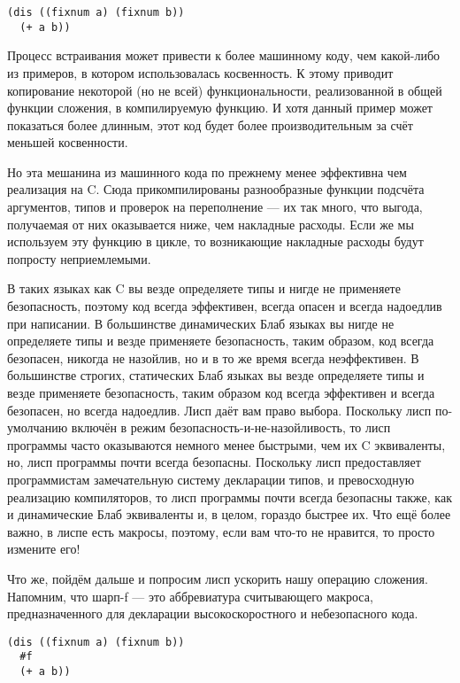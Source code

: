 \begin{verbatim}
(dis ((fixnum a) (fixnum b))
  (+ a b))
\end{verbatim}

Процесс встраивания может привести к более машинному коду, чем какой-либо из примеров, в котором использовалась косвенность. К этому приводит копирование некоторой (но не всей) функциональности, реализованной в общей функции сложения, в компилируемую функцию. И хотя данный пример может показаться более длинным, этот код будет более производительным за счёт меньшей косвенности.

Но эта мешанина из машинного кода по прежнему менее эффективна чем реализация на C. Сюда прикомпилированы разнообразные функции подсчёта аргументов, типов и проверок на переполнение --- их так много, что выгода, получаемая от них оказывается ниже, чем накладные расходы. Если же мы используем эту функцию в цикле, то возникающие накладные расходы будут попросту неприемлемыми.

В таких языках как C вы везде определяете типы и нигде не применяете безопасность, поэтому код всегда эффективен, всегда опасен и всегда надоедлив при написании. В большинстве динамических Блаб языках вы нигде не определяете типы и везде применяете безопасность, таким образом, код всегда безопасен, никогда не назойлив, но и в то же время всегда неэффективен. В большинстве строгих, статических Блаб языках вы везде определяете типы и везде применяете безопасность, таким образом код всегда эффективен и всегда безопасен, но всегда надоедлив. Лисп даёт вам право выбора. Поскольку лисп по-умолчанию включён в режим безопасность-и-не-назойливость, то лисп программы часто оказываются немного менее быстрыми, чем их C эквиваленты, но, лисп программы почти всегда безопасны. Поскольку лисп предоставляет программистам замечательную систему декларации типов, и превосходную реализацию компиляторов, то лисп программы почти всегда безопасны также, как и динамические Блаб эквиваленты и, в целом, гораздо быстрее их. Что ещё более важно, в лиспе есть макросы, поэтому, если вам что-то не нравится, то просто измените его!

Что же, пойдём дальше и попросим лисп ускорить нашу операцию сложения. Напомним, что шарп-f --- это аббревиатура считывающего макроса, предназначенного для декларации высокоскоростного и небезопасного кода.

\begin{verbatim}
(dis ((fixnum a) (fixnum b))
  #f
  (+ a b))
\end{verbatim}

